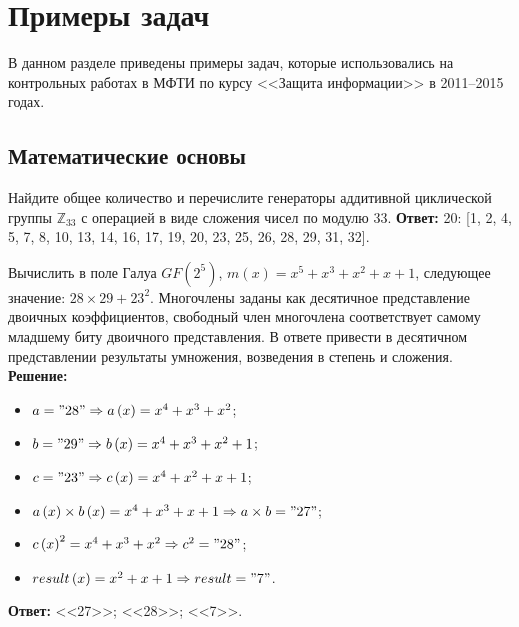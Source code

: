 \chapter{Примеры задач}
\taskinit

В данном разделе приведены примеры задач, которые использовались на контрольных работах в МФТИ по курсу <<Защита информации>> в 2011--2015 годах.

\section{Математические основы}
\tasksection

\tasknumber Найдите общее количество и перечислите генераторы аддитивной циклической группы $\mathbb{Z}_{33}$ с операцией в виде сложения чисел по модулю 33.
\medbreak
\textbf{Ответ:} 20: [1, 2, 4, 5, 7, 8, 10, 13, 14, 16, 17, 19, 20, 23, 25, 26, 28, 29, 31, 32].
\bigbreak

\tasknumber Вычислить в поле Галуа $GF\left( {2^{5} } \right)$, $m\left( x \right) = x^{5} + x^{3} + x^{2} + x + 1$, следующее значение: $28 \times 29 + 23^2$. Многочлены заданы как десятичное представление двоичных коэффициентов, свободный член многочлена соответствует самому младшему биту двоичного представления. В ответе привести в десятичном представлении результаты умножения, возведения в степень и сложения.
\medbreak
\textbf{Решение:}
\begin{itemize}\itemsep1pt \parskip0pt 
	\item $a = "28" \Rightarrow a\left( x \right) = x^{4} + x^{3} + x^{2}$;
	\item $b = "29" \Rightarrow b\left( x \right) = x^{4} + x^{3} + x^{2} + 1$;
	\item $c = "23" \Rightarrow c\left( x \right) = x^{4} + x^{2} + x + 1$;
	\item $a \left( x \right) \times b \left( x \right) = x^{4} + x^{3} + x + 1 \Rightarrow a \times b = "27"$;
	\item $c \left( x \right)^2 = x^{4} + x^{3} + x^{2} \Rightarrow c^2 = "28"$;
	\item $result\left( x \right) = x^{2} + x + 1 \Rightarrow result = "7"$.
\end{itemize}
\medbreak
\textbf{Ответ:} <<27>>; <<28>>; <<7>>.
\bigbreak

